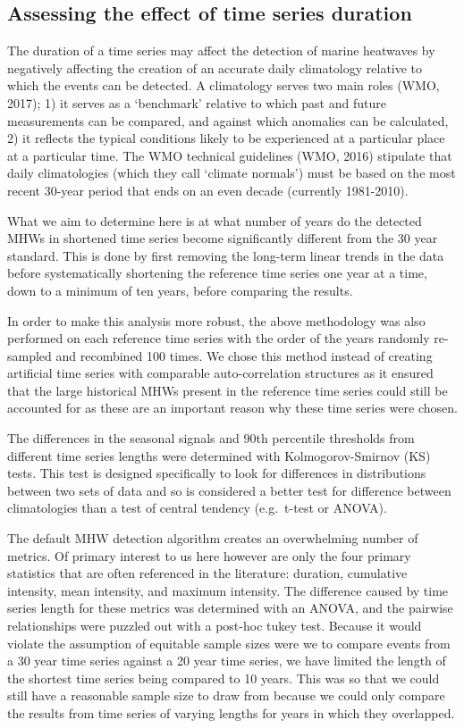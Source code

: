 \documentclass[]{article}
\begin{document}
\subsection{Assessing the effect of time series
duration}\label{assessing-the-effect-of-time-series-duration}

The duration of a time series may affect the detection of marine
heatwaves by negatively affecting the creation of an accurate daily
climatology relative to which the events can be detected. A climatology
serves two main roles (WMO, 2017); 1) it serves as a `benchmark'
relative to which past and future measurements can be compared, and
against which anomalies can be calculated, 2) it reflects the typical
conditions likely to be experienced at a particular place at a
particular time. The WMO technical guidelines (WMO, 2016) stipulate that
daily climatologies (which they call `climate normals') must be based on
the most recent 30-year period that ends on an even decade (currently
1981-2010).

What we aim to determine here is at what number of years do the detected
MHWs in shortened time series become significantly different from the 30
year standard. This is done by first removing the long-term linear
trends in the data before systematically shortening the reference time
series one year at a time, down to a minimum of ten years, before
comparing the results.

In order to make this analysis more robust, the above methodology was
also performed on each reference time series with the order of the years
randomly re-sampled and recombined 100 times. We chose this method
instead of creating artificial time series with comparable
auto-correlation structures as it ensured that the large historical MHWs
present in the reference time series could still be accounted for as
these are an important reason why these time series were chosen.

The differences in the seasonal signals and 90th percentile thresholds
from different time series lengths were determined with
Kolmogorov-Smirnov (KS) tests. This test is designed specifically to
look for differences in distributions between two sets of data and so is
considered a better test for difference between climatologies than a
test of central tendency (e.g.~t-test or ANOVA).

The default MHW detection algorithm creates an overwhelming number of
metrics. Of primary interest to us here however are only the four
primary statistics that are often referenced in the literature:
duration, cumulative intensity, mean intensity, and maximum intensity.
The difference caused by time series length for these metrics was
determined with an ANOVA, and the pairwise relationships were puzzled
out with a post-hoc tukey test. Because it would violate the assumption
of equitable sample sizes were we to compare events from a 30 year time
series against a 20 year time series, we have limited the length of the
shortest time series being compared to 10 years. This was so that we
could still have a reasonable sample size to draw from because we could
only compare the results from time series of varying lengths for years
in which they overlapped.
\end{document}
